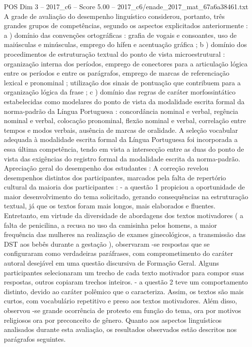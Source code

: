 \begin{textsample}{POS Dim 3 – 2017\_c6 – Score 5.00 – 2017\_c6/enade\_2017\_mat\_67a6a38461.txt}
A grade de avaliação do desempenho linguístico considerou, portanto, três grandes grupos de competências, segundo os aspectos explicitados anteriormente : a ) domínio das convenções ortográficas : grafia de vogais e consoantes, uso de maiúsculas e minúsculas, emprego do hífen e acentuação gráfica ; b ) domínio dos procedimentos de estruturação textual do ponto de vista microestrutural : organização interna dos períodos, emprego de conectores para a articulação lógica entre os períodos e entre os parágrafos, emprego de marcas de referenciação lexical e pronominal ; utilização dos sinais de pontuação que contribuem para a organização lógica da frase ; c ) domínio das regras de caráter morfossintático estabelecidas como modelares do ponto de vista da modalidade escrita formal da norma-padrão da Língua Portuguesa : concordância nominal e verbal, regência nominal e verbal, colocação pronominal, flexão nominal e verbal, correlação entre tempos e modos verbais, ausência de marcas de oralidade.
A seleção vocabular adequada à modalidade escrita formal da Língua Portuguesa foi incorporada a essa última competência, tendo em vista a intersecção entre as duas do ponto de vista das exigências do registro formal da modalidade escrita da norma-padrão.
Apreciação geral do desempenho dos estudantes : A correção revelou desempenhos distintos dos participantes, marcados pela falta de repertório cultural da maioria dos participantes : - a questão 1 propiciou a oportunidade de maior desenvolvimento do tema solicitado, gerando consequências na estruturação textual, já que os textos foram mais longos, mais elaborados e fluentes.
Entretanto, em virtude da diversidade de abordagens dos textos motivadores ( a falta de penicilina, a recusa no uso da camisinha pelos homens, a maior frequência das mulheres na realização de exames ginecológicos, a transmissão das DST aos bebês durante a gestação ), observaram -se respostas que se configuraram como verdadeiras paráfrases, com comprometimento do caráter autoral desejável em uma questão discursiva de Formação Geral.
Alguns participantes selecionaram um trecho de cada texto motivador para compor suas respostas, outros copiaram trechos inteiros. - a questão 2 teve um comportamento distinto, devido ao caráter polêmico que o caracteriza.
Assim, os textos são mais curtos, com vocabulário repetitivo e preso aos textos motivadores.
Além disso, observou -se grande ocorrência de protesto em função do tema, ora por motivos religiosos ora por preconceito de gênero.
Quanto aos aspectos linguísticos analisados durante esta avaliação, os resultados observados estão descritos nos parágrafos seguintes.

\end{textsample}
